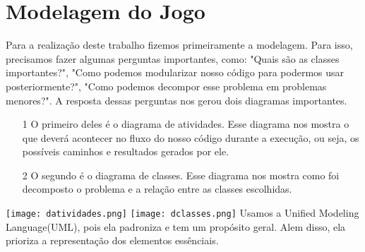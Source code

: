 \documentclass[12pt]{article}
\begin{document}
	\section{Modelagem do Jogo}
		Para a realização deste trabalho fizemos primeiramente a modelagem. Para isso, precisamos fazer algumas perguntas importantes, como: "Quais são as classes importantes?", "Como podemos modularizar nosso código para podermos usar posteriormente?", "Como podemos decompor esse problema em problemas menores?".
		A resposta dessas perguntas nos gerou dois diagramas importantes. 
		\begin{enumerate}
			\item[1] O primeiro deles é o diagrama de atividades. Esse diagrama nos mostra o que deverá acontecer no fluxo do nosso código durante a execução, ou seja, os possíveis caminhos e resultados gerados por ele.
			\item[2] O segundo é o diagrama de classes. Esse diagrama nos mostra como foi decomposto o problema e a relação entre as classes escolhidas.
		\end{enumerate}
            \texttt{[image: datividades.png]}
            \texttt{[image: dclasses.png]}
		Usamos a Unified Modeling Language(UML), pois ela padroniza e tem um propósito geral. Alem disso, ela prioriza a representação dos elementos essênciais.
\end{document}
